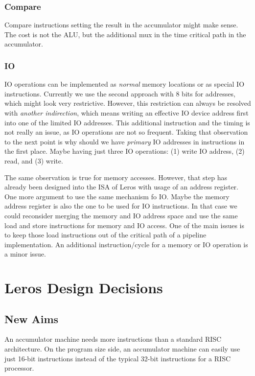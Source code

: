 \documentclass[a4paper,fontsize=10pt,twoside,DIV15,BCOR12mm,headinclude=true,footinclude=false,pagesize,bibtotoc]{scrbook}
\begin{document}
\subsection{Compare}

Compare instructions setting the result in the accumulator might make sense. The cost is not
the ALU, but the additional mux in the time critical path in the accumulator.

\subsection{IO}

IO operations can be implemented as \emph{normal} memory locations or as special IO instructions.
Currently we use the second approach with 8 bits for addresses, which might look very restrictive.
However, this restriction can always be resolved with \emph{another indirection}, which means writing
an effective IO device address first into one of the limited IO addresses. This additional instruction and
the timing is not really an issue, as IO operations are not so frequent.
Taking that observation to the next point is why should we have \emph{primary} IO addresses in
instructions in the first place. Maybe having just three IO operations: (1) write IO address, (2) read,
and (3) write.

The same observation is true for memory accesses. However, that step has already been designed
into the ISA of Leros with usage of an address register. One more argument to use the same mechanism
fo IO. Maybe the memory address register is also the one to be used for IO instructions.
In that case we could reconsider merging the memory and IO address space and use the same
load and store instructions for memory and IO access. One of the main issues is to keep those
load instructions out of the critical path of a pipeline implementation. An additional instruction/cycle
for a memory or IO operation is a minor issue.



\chapter{Leros Design Decisions}
\label{sec:design}

\section{New Aims}

An accumulator machine needs more instructions than a standard RISC architecture.
On the program size side, an accumulator machine can easily use just 16-bit instructions
instead of the typical 32-bit instructions for a RISC processor.
\end{document}
